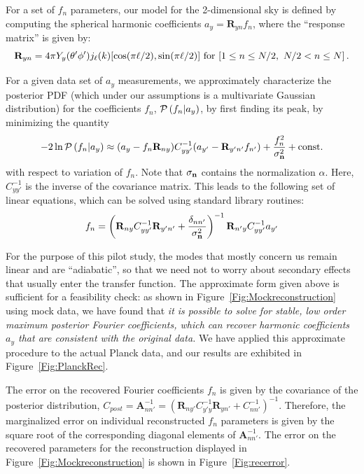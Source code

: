 \documentclass[psfig,12pt]{article}
\begin{document}
{For a set of $f_n$ parameters, our model for the 2-dimensional sky is defined by computing the spherical harmonic coefficients $a_y
=\mathbf{R}_{yn}f_n$, where the ``response
matrix'' is given by:
\begin{equation}
\mathbf{R}_{yn}=4\pi Y_y(\theta'\phi')j_\ell(k)[\cos(\pi\ell/2),\sin(\pi\ell/2)]\ {\rm for}\ [1\le n\le N/2,\ N/2<n\le N]\, .
\end{equation}

For a given data set of $a_y$ measurements, we approximately characterize the posterior PDF (which under our
assumptions is a multivariate Gaussian distribution) for the
coefficients $f_n$, ${\cal P}\left(f_n|a_y\right)$, by first finding its peak, by minimizing the quantity
\begin{equation}
-2\ln{\cal P}\left(f_n|a_y\right) \approx (a_y- f_n\mathbf{R}_{ny})C_{yy'}^{-1}(a_{y'}-\mathbf{R}_{y'n'}f_{n'})+\frac{f_n^2}{\sigma_{{\bf n}}^2} + \mathrm{const.}
\end{equation}
with respect to variation of $f_n$. Note that $\sigma_{\bf n}$ contains
the normalization $\alpha$.
Here, $C_{yy'}^{-1}$ is the inverse
of the covariance matrix. This leads to the following set of
linear equations, which can be solved using standard library routines:
\begin{equation}
f_n=\left(\mathbf{R}_{ny}C_{yy'}^{-1}\mathbf{R}_{y'n'}+\frac{\delta_{nn'}}{\sigma_{\bf n}^2}\right)^{-1}\mathbf{R}_{n'y}C_{yy'}^{-1}a_{y'}
\label{eq:mostprobablemodel}
\end{equation}



For the purpose of this pilot study, the modes that mostly concern us remain linear and are ``adiabatic'', so that we need not to worry about secondary effects that usually enter the transfer function. The approximate form given above is sufficient for a feasibility check:
as shown in Figure~\ref{Fig:Mockreconstruction} using mock data, we have found that {\it it is possible to solve for
stable, low order maximum posterior Fourier coefficients, which can
recover harmonic coefficients $a_y$ that are consistent with the
original data.} We have applied this approximate procedure to the
actual Planck data, and our results are exhibited in Figure~\ref{Fig:PlanckRec}.

The error on the recovered Fourier coefficients $f_n$ is given by the covariance of the posterior distribution,
$C_{post}=\mathbf{A}_{nn'}^{-1} = \left(\mathbf{R}_{ny'}C^{-1}_{y'y} \mathbf{R}_{yn'}+C_{nn'}^{-1}\right)^{-1}$.
Therefore, the marginalized error on individual reconstructed $f_n$ parameters is given by the square root of the corresponding diagonal elements of $\mathbf{A}_{nn'}^{-1} $. The error on the recovered parameters for the reconstruction displayed in Figure~\ref{Fig:Mockreconstruction} is shown in Figure~\ref{Fig:recerror}.



}
\end{document}
